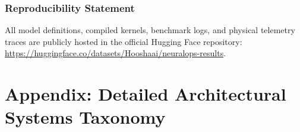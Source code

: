 \documentclass{article}
\begin{document}
\subsubsection*{Reproducibility Statement}
All model definitions, compiled kernels, benchmark logs, and physical telemetry traces are publicly hosted in the official Hugging Face repository:
\url{https://huggingface.co/datasets/Hooshaai/neuralops-results}.




\newpage
\appendix
\section{Appendix: Detailed Architectural Systems Taxonomy}
\label{sec:appendix_taxonomy}
\end{document}
